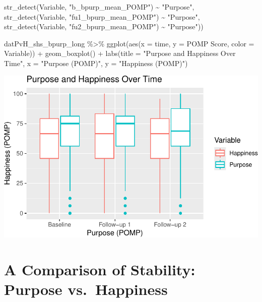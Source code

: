 \documentclass[
  letterpaper,
  DIV=11,
  numbers=noendperiod]{scrartcl}
\newenvironment{Shaded}{\begin{snugshade}}{\end{snugshade}}
\newcommand{\AttributeTok}[1]{\textcolor[rgb]{0.40,0.45,0.13}{#1}}
\newcommand{\FunctionTok}[1]{\textcolor[rgb]{0.28,0.35,0.67}{#1}}
\newcommand{\NormalTok}[1]{\textcolor[rgb]{0.00,0.23,0.31}{#1}}
\newcommand{\SpecialCharTok}[1]{\textcolor[rgb]{0.37,0.37,0.37}{#1}}
\newcommand{\StringTok}[1]{\textcolor[rgb]{0.13,0.47,0.30}{#1}}
\begin{document}
\begin{Shaded}
\begin{Highlighting}[]
                              \FunctionTok{str\_detect}\NormalTok{(Variable, }\StringTok{"b\_bpurp\_mean\_POMP"}\NormalTok{) }\SpecialCharTok{\textasciitilde{}} \StringTok{"Purpose"}\NormalTok{,}
                              \FunctionTok{str\_detect}\NormalTok{(Variable, }\StringTok{"fu1\_bpurp\_mean\_POMP"}\NormalTok{) }\SpecialCharTok{\textasciitilde{}} \StringTok{"Purpose"}\NormalTok{,}
                              \FunctionTok{str\_detect}\NormalTok{(Variable, }\StringTok{"fu2\_bpurp\_mean\_POMP"}\NormalTok{) }\SpecialCharTok{\textasciitilde{}} \StringTok{"Purpose"}\NormalTok{))}



\NormalTok{datPvH\_shs\_bpurp\_long }\SpecialCharTok{\%\textgreater{}\%} 
  \FunctionTok{ggplot}\NormalTok{(}\FunctionTok{aes}\NormalTok{(}\AttributeTok{x =}\NormalTok{ time, }\AttributeTok{y =} \StringTok{\textasciigrave{}}\AttributeTok{POMP Score}\StringTok{\textasciigrave{}}\NormalTok{, }\AttributeTok{color =}\NormalTok{ Variable)) }\SpecialCharTok{+}
  \FunctionTok{geom\_boxplot}\NormalTok{() }\SpecialCharTok{+}
  \FunctionTok{labs}\NormalTok{(}\AttributeTok{title =} \StringTok{"Purpose and Happiness Over Time"}\NormalTok{,}
       \AttributeTok{x =} \StringTok{"Purpose (POMP)"}\NormalTok{,}
       \AttributeTok{y =} \StringTok{"Happiness (POMP)"}\NormalTok{)}
\end{Highlighting}
\end{Shaded}

\includegraphics{purpose_vs_happiness_supplement_files/figure-pdf/data_details-1.pdf}

\section{A Comparison of Stability: Purpose
vs.~Happiness}\label{a-comparison-of-stability-purpose-vs.-happiness}
\end{document}

